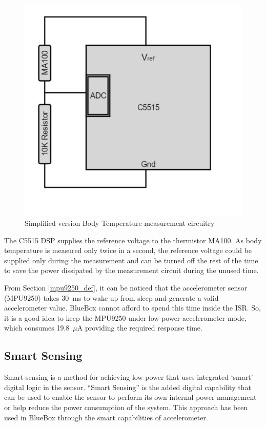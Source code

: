  \begin{figure}
 	\centering
 	\includegraphics[scale = 0.5 ]{body_temp}
\caption{Simplified version Body Temperature measurement circuitry}
\label{body_temp}
 \end{figure}

The C5515 DSP supplies the reference voltage to the thermistor MA100.
As body temperature is measured only twice in a second, the reference
voltage could be supplied only during the measurement and can be
turned off the rest of the time to save the power dissipated by the
measurement circuit during the unused time.
 
From Section \ref{mpu9250_def}, it can be noticed that the
accelerometer sensor (MPU9250) takes 30~ms to wake up from sleep and
generate a valid accelerometer value. BlueBox cannot afford to spend
this time inside the ISR. So, it is a good idea to keep the MPU9250
under low-power accelerometer mode, which consumes 19.8~$\mu$A
providing the required response time.
 
 \subsection{Smart Sensing}

Smart sensing is a method for achieving low power that uses
integrated `smart' digital logic in the sensor. ``Smart Sensing'' is
the added digital capability that can be used to enable the sensor to
perform its own internal power management or help reduce the power
consumption of the system. This approach has been used in BlueBox
through the smart capabilities of accelerometer.
 
